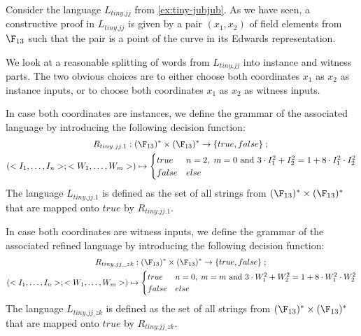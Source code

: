 \begin{example}
\label{ex:tiny-jubjub-instance-witness}
 Consider the language $L_{tiny.jj}$ from \examplename{} \ref{ex:tiny-jubjub}. As we have seen, a constructive proof in $L_{tiny.jj}$ is given by a pair $(x_1,x_2)$ of field elements from $\F_{13}$ such that the pair is a point of the  curve in its Edwards representation.

We look at a reasonable splitting of words from $L_{tiny.jj}$ into instance and witness parts. The two obvious choices are to either choose both coordinates $x_1$ as $x_2$ as instance inputs, or to choose both coordinates $x_1$ as $x_2$ as witness inputs. 

In case both coordinates are instances, we define the grammar of the associated language by introducing the following decision function:
\begin{multline*}
R_{tiny.jj.1} : (\F_{13})^*\times (\F_{13})^* \to \{true, false\}\;;\;\\
(<I_1,\ldots,I_n>;<W_1,\ldots,W_m>) \mapsto
\begin{cases}
true & n=2,\;m=0 \text{ and } 3\cdot I_1^2 + I_2^2 = 1+ 8\cdot I_1^2\cdot I_2^2\\
false & else
\end{cases}
\end{multline*}
The language $L_{tiny.jj.1}$ is defined as the set of all strings from $(\F_{13})^*\times (\F_{13})^*$ that are mapped onto $true$ by $R_{tiny.jj.1}$. 

In case both coordinates are witness inputs, we define the grammar of the associated refined language by introducing the following decision function:
\begin{multline*}
R_{tiny.jj\_zk} : (\F_{13})^*\times (\F_{13})^* \to \{true, false\}\;;\;\\
(<I_1,\ldots,I_n>;<W_1,\ldots,W_m>) \mapsto
\begin{cases}
true & n=0,\;m=m \text{ and } 3\cdot W_1^2 + W_2^2 = 1+ 8\cdot W_1^2\cdot W_2^2\\
false & else
\end{cases}
\end{multline*}
The language $L_{tiny.jj\_zk}$ is defined as the set of all strings from $(\F_{13})^*\times (\F_{13})^*$ that are mapped onto $true$ by $R_{tiny.jj\_zk}$. 
\end{example}


